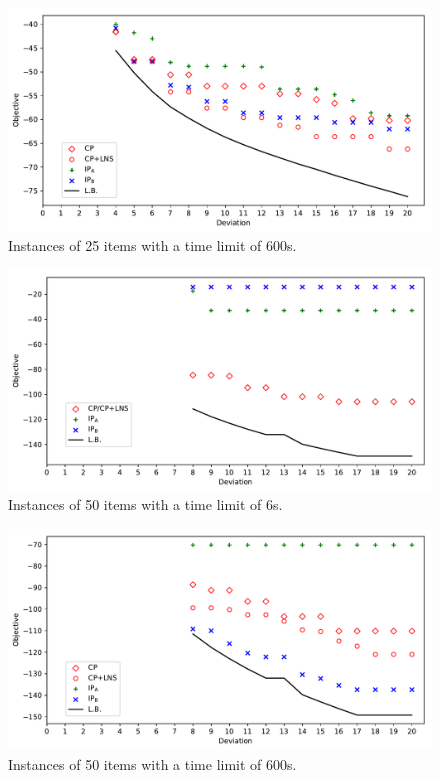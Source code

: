 \documentclass{llncs}
\begin{document}
\begin{figure}[H]
  \begin{center}
    \caption[]{Instances of 25 items with a time limit of 600s.}
    \includegraphics[scale=0.52]{new25-norm1-tl600.pdf}
  \end{center}
\end{figure}

\begin{figure}[H]
  \begin{center}
    \caption[]{Instances of 50 items with a time limit of 6s.}
    \includegraphics[scale=0.52]{new50-norm1-tl6.pdf}
  \end{center}
\end{figure}

\begin{figure}[H]
  \begin{center}
    \caption[]{Instances of 50 items with a time limit of 600s.}
    \includegraphics[scale=0.52]{new50-norm1-tl600.pdf}
  \end{center}
\end{figure}
\end{document}
